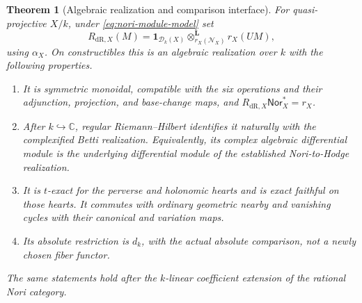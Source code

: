 \documentclass[11pt]{article}
\numberwithin{equation}{section}
\newtheorem{theorem}{Theorem}[section]
\theoremstyle{definition}
\theoremstyle{remark}
\newcommand{\C}{\mathbb C}
\newcommand{\dR}{\mathrm{dR}}
\newcommand{\one}{\mathbf1}
\begin{document}
\begin{theorem}[Algebraic realization and comparison interface]
\label{thm:algebraic-interface}
For quasi-projective $X/k$, under \eqref{eq:nori-module-model} set
\begin{equation}\label{eq:relative-algebraic-realization}
 R_{\dR,X}(M)=
 \one_{\mathscr D_k(X)}\otimes^{\mathbf L}_{r_X(\mathscr N_X)}
 r_X(UM),
\end{equation}
using $\alpha_X$. On constructibles this is an algebraic realization over
$k$ with the following properties.
\begin{enumerate}[label=\textup{(\roman*)},leftmargin=2.5em]
\item It is symmetric monoidal, compatible with the six operations and their
adjunction, projection, and base-change maps, and
$R_{\dR,X}\mathsf{Nor}_X^*=r_X$.
\item After $k\hookrightarrow\C$, regular Riemann--Hilbert identifies it
naturally with the complexified Betti realization. Equivalently, its
complex algebraic differential module is the underlying differential
module of the established Nori-to-Hodge realization.
\item It is $t$-exact for the perverse and holonomic hearts and is exact
faithful on those hearts. It commutes with ordinary geometric nearby and
vanishing cycles with their canonical and variation maps.
\item Its absolute restriction is $d_k$, with the actual absolute
comparison, not a newly chosen fiber functor.
\end{enumerate}
The same statements hold after the $k$-linear coefficient extension of the
rational Nori category.
\end{theorem}
\end{document}
